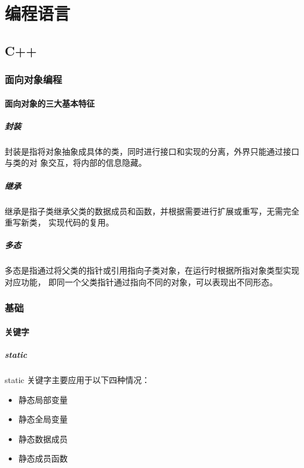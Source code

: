 \part{编程语言}
\chapter{C++}
\section{面向对象编程}
\subsection{面向对象的三大基本特征}

\subsubsection{封装}
封装是指将对象抽象成具体的类，同时进行接口和实现的分离，外界只能通过接口与类的对
象交互，将内部的信息隐藏。

\subsubsection{继承}
继承是指子类继承父类的数据成员和函数，并根据需要进行扩展或重写，无需完全重写新类，
实现代码的复用。

\subsubsection{多态}
多态是指通过将父类的指针或引用指向子类对象，在运行时根据所指对象类型实现对应功能，
即同一个父类指针通过指向不同的对象，可以表现出不同形态。

\section{基础}
\subsection{关键字}
\subsubsection{static}
static 关键字主要应用于以下四种情况：

\begin{itemize}
  \item 静态局部变量
  \item 静态全局变量
  \item 静态数据成员
  \item 静态成员函数
\end{itemize}

